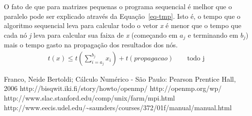 \documentclass[a4paper]{article}
\begin{document}
\newpage
\indent O fato de que para matrizes pequenas o programa sequencial é melhor que o paralelo pode ser explicado através da Equação~\ref{eq-tmp}. Isto é, o tempo que o algoritmo sequencial leva para calcular todo o vetor \emph{x} é menor que o tempo que cada nó \emph{j} leva para calcular sua faixa de \emph{x} (começando em \emph{\begin{math}a_j\end{math}} e terminando em \emph{\begin{math}b_j\end{math}}) mais o tempo gasto na propagação dos resultados dos nós.
\begin{eqnarray} \label{eq-tmp}
	t(x) \le t(\sum_{i=a_j}^{b_j}x_i) + t(propagacao) \qquad \textrm{todo j}
\end{eqnarray}

\newpage
\begin{thebibliography}{99}
	 Franco, Neide Bertoldi; Cálculo Numérico - São Paulo: Pearson Prentice Hall, 2006
	 http://bisqwit.iki.fi/story/howto/openmp/
	 http://openmp.org/wp/
	 http://www.slac.stanford.edu/comp/unix/farm/mpi.html
	 http://www.eecis.udel.edu/\~{}saunders/courses/372/01f/manual/manual.html
\end{thebibliography}
\end{document}
